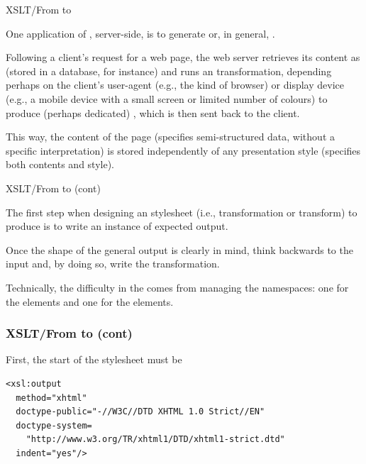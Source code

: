 %
\begin{frame}{XSLT/From \XML to \XHTML}

One application of \XML, server-side, is to generate \XHTML or,
in general, \HTML.

\bigskip

Following a client's request for a web page, the web server retrieves
 its content as \XML (stored in a database, for instance) and runs an
 \XSLT transformation, depending perhaps on the client's
 user-agent (e.g., the kind of browser) or display device (e.g.,
 a mobile device with a small screen or limited number of colours) to
 produce (perhaps dedicated) \HTML, which is then sent back to the
 client.

\bigskip

This way, the content of the page (\XML specifies semi-structured
data, without a specific interpretation) is stored independently of
any presentation style (\HTML specifies both contents and style).

\end{frame}

%
\begin{frame}{XSLT/From \XML to \XHTML (cont)}

The first step when designing an \XSLT stylesheet (i.e.,
transformation or transform) to produce \XHTML is to write an instance
of expected output.

\bigskip

Once the shape of the general output is clearly in mind, think
backwards to the input and, by doing so, write the transformation.

\bigskip

Technically, the difficulty in the \XSLT comes from managing the
namespaces: one for the \XSLT elements and one for the \XHTML
elements.

\end{frame}

%
\begin{frame}[containsverbatim]
\frametitle{XSLT/From \XML to \XHTML (cont)}

First, the start of the \XSLT stylesheet must be
{\small
\begin{verbatim}
<xsl:output
  method="xhtml"
  doctype-public="-//W3C//DTD XHTML 1.0 Strict//EN"
  doctype-system=
    "http://www.w3.org/TR/xhtml1/DTD/xhtml1-strict.dtd"
  indent="yes"/>
\end{verbatim}
}

\end{frame}

